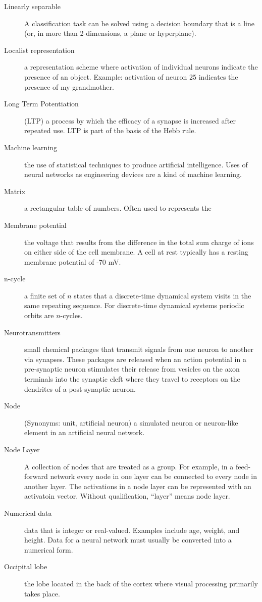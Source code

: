 \begin{description}
\item[Linearly separable] A classification task can be solved using a decision boundary that is a line (or, in more than 2-dimensions, a plane or hyperplane).
\item[Localist representation] a representation scheme where activation of individual neurons indicate the presence of an object. Example: activation of neuron 25 indicates the presence of my grandmother.
\item[Long Term Potentiation] (LTP) a process by which the efficacy of a synapse is increased after repeated use. LTP is part of the basis of the Hebb rule.
\item[Machine learning] the use of statistical techniques to produce artificial intelligence. Uses of neural networks as engineering devices are a kind of machine learning.
\item[Matrix] a rectangular table of numbers. Often used to represents the 
\item[Membrane potential] the voltage that results from the difference in the total sum charge of ions on either side of the cell membrane. A cell at rest typically has a resting membrane potential of -70 mV. 
\item[n-cycle] a finite set of $n$ states that a discrete-time dynamical system visits in the same repeating sequence. For discrete-time dynamical systems periodic orbits are $n$-cycles.
\item[Neurotransmitters] small chemical packages that transmit signals from one neuron to another via synapses. These packages are released when an action potential in a pre-synaptic neuron stimulates their release from vesicles on the axon terminals into the synaptic cleft where they travel to receptors on the dendrites of a post-synaptic neuron. 
\item[Node] (Synonyms: unit, artificial neuron) a simulated neuron or neuron-like element in an artificial neural network. 
\item[Node Layer] A collection of nodes that are treated as a group. For example, in a feed-forward network every node in one layer can be connected to every node in another layer. The activations in a node layer can be represented with an activatoin vector. Without qualification, ``layer'' means node layer.
\item[Numerical data] data that is integer or real-valued. Examples include age, weight, and height. Data for a neural network must usually be converted into a numerical form.
\item[Occipital lobe] the lobe located in the back of the cortex where visual processing primarily takes place. 

\end{description}
